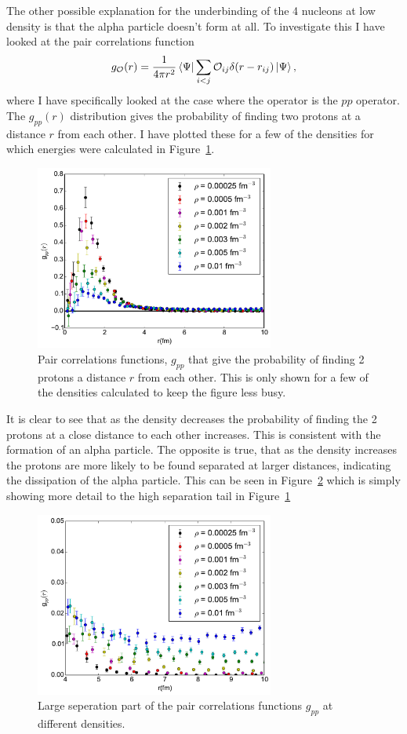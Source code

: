 The other possible explanation for the underbinding of the 4 nucleons at low density is that the alpha particle doesn't form at all. To investigate this I have looked at the pair correlations function
\begin{equation}
   g_\mathcal{O}(r) = \frac{1}{4\pi r^2} \left< \Psi \right|\sum\limits_{i<j}\mathcal{O}_{ij}\delta(r-r_{ij})\left| \Psi \right>,
\end{equation}
where I have specifically looked at the case where the operator is the $pp$ operator. The $g_{pp}(r)$ distribution gives the probability of finding two protons at a distance $r$ from each other. I have plotted these for a few of the densities for which energies were calculated in Figure~\ref{fig:gpp}.
\begin{figure}[h!]
   \centering
   \includegraphics[width=0.7\textwidth]{figures/gpp.pdf}
   \caption{Pair correlations functions, $g_{pp}$ that give the probability of finding 2 protons a distance $r$ from each other. This is only shown for a few of the densities calculated to keep the figure less busy.}
   \label{fig:gpp}
\end{figure}
It is clear to see that as the density decreases the probability of finding the 2 protons at a close distance to each other increases. This is consistent with the formation of an alpha particle. The opposite is true, that as the density increases the protons are more likely to be found separated at larger distances, indicating the dissipation of the alpha particle. This can be seen in Figure~\ref{fig:gpp_small} which is simply showing more detail to the high separation tail in Figure~\ref{fig:gpp}
\begin{figure}[h!]
   \centering
   \includegraphics[width=0.7\textwidth]{figures/gpp_small.pdf}
   \caption{Large seperation part of the pair correlations functions $g_{pp}$ at different densities.}
   \label{fig:gpp_small}
\end{figure}

